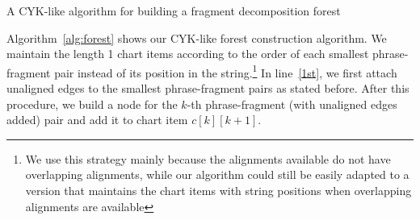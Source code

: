 \begin{algorithm}[t]
\small
\caption{A CYK-like algorithm for building a fragment decomposition forest}
\begin{algorithmic}[1]
     \label{1st}
     \label{2nd}
     \label{3rd}
     \label{4th}
                         \label{new}
                             \label{5th}
                                \ENDIF \label{6th}
                                 \label{7th}
                        \ENDIF
                    \ENDFOR
                \ENDFOR
            \ENDFOR
        \ENDFOR
    \ENDFOR
  \end{algorithmic} 
  \label{alg:forest} 
\end{algorithm}
Algorithm~\ref{alg:forest} shows our CYK-like forest construction algorithm. We maintain the length 1 chart items according to the order of each smallest phrase-fragment
pair instead of its position in the string.\footnote{We use this strategy mainly because the alignments available do not have
overlapping alignments, while our algorithm could still be easily adapted to a version that maintains the chart items with string
positions when overlapping alignments are available} In line~\ref{1st}, we first attach unaligned edges to the smallest phrase-fragment pairs as stated before.
After this procedure, we build a node for the $k$-th phrase-fragment (with unaligned edges added) pair and add it to chart item $c[k][k+1]$.
